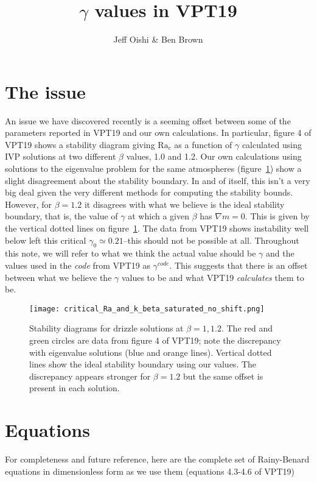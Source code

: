 \documentclass[11pt]{article}
\title{$\gamma$ values in VPT19}
\newcommand{\Rayleigh}{\mathrm{Ra}}
\begin{document}
\author{Jeff Oishi \& Ben Brown}
\maketitle

\section{The issue}
\label{sec:issue}


An issue we have discovered recently is a seeming offset between some of the parameters reported in VPT19 and our own calculations. In particular, figure 4 of VPT19 shows a stability diagram giving $\Rayleigh_c$ as a function of $\gamma$ calculated using IVP solutions at two different $\beta$ values, 1.0 and 1.2. Our own calculations using solutions to the eigenvalue problem for the same atmospheres (figure~\ref{fig:stability}) show a slight disagreement about the stability boundary. In and of itself, this isn't a very big deal given the very different methods for computing the stability bounds. However, for $\beta = 1.2$ it disagrees with what we believe is the ideal stability boundary, that is, the value of $\gamma$ at which a given $\beta$ has $\nabla m = 0$. This is given by the vertical dotted lines on figure~\ref{fig:stability}. The data from VPT19 shows instability well below left this critical $\gamma_0 \simeq 0.21$--this should not be possible at all. Throughout this note, we will refer to what we think the actual value should be $\gamma$ and the values used in the \emph{code} from VPT19 as $\gamma^{code}$.
This suggests that there is an offset between what we believe the $\gamma$ values to be and what VPT19 \emph{calculates} them to be. 
\begin{figure}[!h]
  \centering
  \texttt{[image: critical\_Ra\_and\_k\_beta\_saturated\_no\_shift.png]}
  \caption{Stability diagrams for drizzle solutions at $\beta = 1,1.2$. The red and green circles are data from figure 4 of VPT19; note the discrepancy with eigenvalue solutions (blue and orange lines). Vertical dotted lines show the ideal stability boundary using our values. The discrepancy appears stronger for $\beta=1.2$ but the same offset is present in each solution.}
  \label{fig:stability}
\end{figure}
\section{Equations}
\label{sec:eqns}
For completeness and future reference, here are the complete set of Rainy-Benard equations in dimensionless form as we use them (equations 4.3-4.6 of VPT19)
\end{document}
